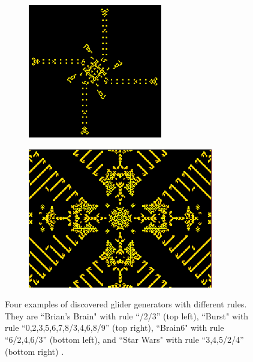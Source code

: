 \documentclass[12pt]{article}
\numberwithin{figure}{section} %
\begin{document}
\begin{figure}[H]
\begin{subfigure}{0.42\textwidth}
     		\includegraphics[width=\linewidth]{Section1/8.3}
     		\subcaption{}
   	\end{subfigure}
     	\begin{subfigure}{0.56\textwidth}
     	\centering
     		\includegraphics[width=\linewidth]{Section1/8.4}
     		\subcaption{}
   	\end{subfigure}
   	\caption[Examples of famous spaceships]{Four examples of discovered glider generators with different rules. They are “Brian’s Brain" with rule “/2/3” (top left), “Burst" with rule “0,2,3,5,6,7,8/3,4,6,8/9” (top right), “Brain6" with rule “6/2,4,6/3” (bottom left), and “Star Wars" with rule “3,4,5/2/4” (bottom right) \cite{Lexicon}.}
   	\label{fig:famous spaceships}
   	\vspace{-1.5em}
\end{figure}
\end{document}
